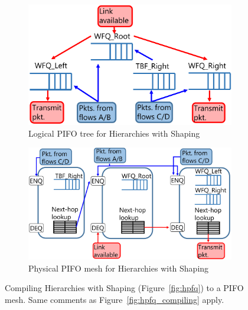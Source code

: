 
\begin{figure}[!t]
  \begin{subfigure}[b]{0.5\textwidth}
  \includegraphics[width=\textwidth]{pifo_hshaping_logical.pdf}
  \caption{Logical PIFO tree for Hierarchies with Shaping}
  \label{fig:hshaping_path}
  \end{subfigure}
  \begin{subfigure}[b]{0.5\textwidth}
  \includegraphics[width=\textwidth]{pifo_hshaping_physical.pdf}
  \caption{Physical PIFO mesh for Hierarchies with Shaping}
  \label{fig:hshaping_mesh}
  \end{subfigure}
  \caption{Compiling Hierarchies with Shaping (Figure~\ref{fig:hpfq}) to a PIFO mesh. Same comments as Figure~\ref{fig:hpfq_compiling} apply.}
\end{figure}


